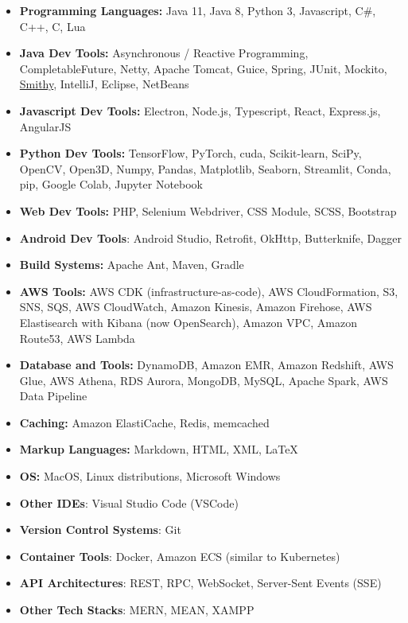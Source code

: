 \clearpage
\newcommand{\Smithy}{\href{https://smithy.io/}{Smithy}}
\begin{itemize}[label={}, leftmargin=0in]
   \setlength\itemsep{0em}
   \item \textbf{Programming Languages:} Java 11, Java 8, Python 3, Javascript, C\#, C++, C, Lua
   \item \textbf{Java Dev Tools:} Asynchronous / Reactive Programming, CompletableFuture, Netty, Apache Tomcat, Guice, Spring, JUnit, Mockito, \Smithy, IntelliJ, Eclipse, NetBeans
   \item \textbf{Javascript Dev Tools:} Electron, Node.js, Typescript, React, Express.js, AngularJS
   \item \textbf{Python Dev Tools:} TensorFlow, PyTorch, cuda, Scikit-learn, SciPy, OpenCV, Open3D, Numpy, Pandas, Matplotlib, Seaborn, Streamlit, Conda, pip, Google Colab, Jupyter Notebook
   \item \textbf{Web Dev Tools:} PHP, Selenium Webdriver, CSS Module, SCSS, Bootstrap
   \item \textbf{Android Dev Tools}: Android Studio, Retrofit, OkHttp, Butterknife, Dagger
   \item \textbf{Build Systems:} Apache Ant, Maven, Gradle
   \item \textbf{AWS Tools:} AWS CDK (infrastructure-as-code), AWS CloudFormation, S3, SNS, SQS, AWS CloudWatch, Amazon Kinesis, Amazon Firehose, AWS Elastisearch with Kibana (now OpenSearch), Amazon VPC, Amazon Route53, AWS Lambda
   \item \textbf{Database and Tools:} DynamoDB, Amazon EMR, Amazon Redshift, AWS Glue, AWS Athena, RDS Aurora, MongoDB, MySQL, Apache Spark, AWS Data Pipeline
   \item \textbf{Caching:} Amazon ElastiCache, Redis, memcached
   \item \textbf{Markup Languages:} Markdown, HTML, XML, \LaTeX
   \item \textbf{OS:} MacOS, Linux distributions, Microsoft Windows
   \item \textbf{Other IDEs}: Visual Studio Code (VSCode)
   \item \textbf{Version Control Systems}: Git
   \item \textbf{Container Tools}: Docker, Amazon ECS (similar to Kubernetes)
   \item \textbf{API Architectures}: REST, RPC, WebSocket, Server-Sent Events (SSE)
   \item \textbf{Other Tech Stacks}: MERN, MEAN, XAMPP
\end{itemize}
